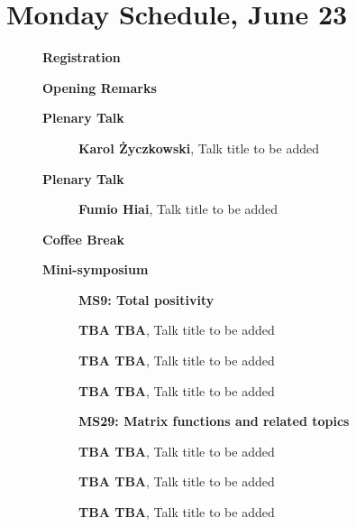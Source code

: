 \documentclass[ILAS2025-program.tex]{subfiles}
\begin{document}
\section{Monday Schedule, June 23}
    
    \begin{description}
    \item[] \textbf{Registration} 
    \item[] \textbf{Opening Remarks} 
    \item[] \textbf{Plenary Talk} 
    \begin{description}
        \item[] \textbf{Karol Życzkowski}, Talk title to be added
        \end{description}
        \item[] \textbf{Plenary Talk} 
    \begin{description}
        \item[] \textbf{Fumio Hiai}, Talk title to be added
        \end{description}
        \item[] \textbf{Coffee Break} 
    \item[] \textbf{Mini-symposium} 
    \begin{description}
    \item[] \textbf{MS9: Total positivity} 
    \item[] \textbf{TBA TBA}, Talk title to be added
        \item[] \textbf{TBA TBA}, Talk title to be added
        \item[] \textbf{TBA TBA}, Talk title to be added
        \end{description}
    \begin{description}
    \item[] \textbf{MS29: Matrix functions and related topics} 
    \item[] \textbf{TBA TBA}, Talk title to be added
        \item[] \textbf{TBA TBA}, Talk title to be added
        \item[] \textbf{TBA TBA}, Talk title to be added

\end{description}
\end{description}
\end{document}
